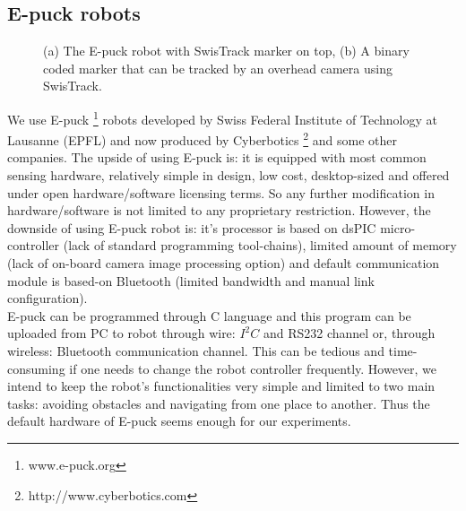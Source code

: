 \subsection{E-puck robots}
\begin{figure}[htp]
\centering
{} 
\hspace{0.25cm}
\caption{(a) The E-puck robot with SwisTrack marker on top, (b) A binary coded marker that can be tracked by an overhead camera  using SwisTrack.}
\label{fig:e-puck}
\end{figure}
We use E-puck \footnote{www.e-puck.org} robots developed by Swiss Federal Institute of Technology at Lausanne (EPFL) and now produced by Cyberbotics \footnote{http://www.cyberbotics.com} and some other companies. The upside of using E-puck is: it is equipped with most common sensing hardware, relatively simple in design, low cost, desktop-sized and offered under open hardware/software licensing terms. So any further modification in hardware/software is not limited to any proprietary restriction. However, the downside of using E-puck robot is: it's processor is based on dsPIC micro-controller (lack of standard programming tool-chains), limited amount of memory (lack of on-board camera image processing option) and default communication module is based-on Bluetooth (limited bandwidth and manual link configuration).\\
E-puck can be programmed through C language and this program can be uploaded from PC to robot through wire: $I^{2}C$ and RS232 channel or, through  wireless: Bluetooth communication channel. This can be tedious and time-consuming if one needs to change the robot controller frequently. However, we intend to keep the robot's functionalities very simple and limited to two main tasks: avoiding obstacles and navigating from one place to another. Thus the default hardware of E-puck seems enough for our experiments.\\ 
